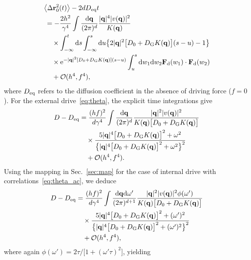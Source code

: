 \documentclass[superscriptaddress, twocolumn, prx, longbibliography, nofootinbib]{revtex4-1}
\begin{document}
\begin{equation}
	\begin{aligned}
		&\big\langle\Delta{\bf r}^2_0(t)\big\rangle - 2 d D_{\rm eq} t
		\\
		&\,= - \frac{2h^2}{\gamma^4} \int \frac{{\rm d}{\bf q}}{(2\pi)^d} \frac{|{\bf q}|^4 |v({\bf q})|^2}{K({\bf q})}
		\\
		&\,\quad\times \int_{-\infty}^t{\rm d}s \int_{-\infty}^s{\rm d}u \big\{ 2|{\bf q}|^2\big[D_0+D_{\rm G}K({\bf q})\big](s-u) - 1\big\}
		\\
		&\,\quad\times {\rm e}^{ -|{\bf q}|^2[D_0+D_{\rm G}K({\bf q})](s-u)} \int_u^s {\rm d}w_1{\rm d}w_2 {\bf F}_{\rm d}(w_1)\cdot{\bf F}_{\rm d}(w_2)
		\\
		&\,\quad + {\cal O}(h^4,f^4) ,
	\end{aligned}
\end{equation}
where $D_{\rm eq}$ refers to the diffusion coefficient in the absence of driving force ($f=0$). For the external drive~\eqref{eq:theta}, the explicit time integrations give
\begin{equation}
	\begin{aligned}
		D - D_{\rm eq} &= \frac{(hf)^2}{d\gamma^4} \int \frac{{\rm d}{\bf q}}{(2\pi)^d} \frac{|{\bf q}|^2|v({\bf q})|^2}{K({\bf q})\big[D_0+D_{\rm G}K({\bf q})\big]}
		\\
		&\quad\times \frac{5|{\bf q}|^4\big[D_0+D_{\rm G}K({\bf q})\big]^2 + \omega^2}{ \big\{ |{\bf q}|^4\big[D_0+D_{\rm G}K({\bf q})\big]^2 + \omega^2 \big\}^2}
		\\
		&\quad + {\cal O}(h^4,f^4) .
	\end{aligned}
\end{equation}
Using the mapping in Sec.~\ref{sec:map} for the case of internal drive with correlations~\eqref{eq:theta_ac}, we deduce
\begin{equation}
	\begin{aligned}
		D - D_{\rm eq} &= \frac{(hf)^2}{d\gamma^4} \int \frac{{\rm d}{\bf q}{\rm d}\omega'}{(2\pi)^{d+1}} \frac{|{\bf q}|^2|v({\bf q})|^2\phi(\omega')}{K({\bf q})\big[D_0+D_{\rm G}K({\bf q})\big]}
		\\
		&\quad\times \frac{5|{\bf q}|^4\big[D_0+D_{\rm G}K({\bf q})\big]^2 + (\omega')^2}{ \big\{ |{\bf q}|^4\big[D_0+D_{\rm G}K({\bf q})\big]^2 + (\omega')^2 \big\}^2}
		\\
		&\quad + {\cal O}(h^4,f^4) ,
	\end{aligned}
\end{equation}
where again $\phi(\omega') = 2\tau/\big[1+(\omega'\tau)^2\big]$, yielding
\end{document}

